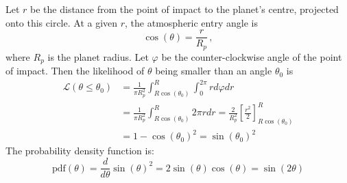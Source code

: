 Let $r$ be the distance from the point of impact to the planet's centre, projected onto this circle. At a given $r$, the atmospheric entry angle is
\begin{equation*}
    \cos(\theta) = \frac{r}{R_p}\,,
\end{equation*}
where $R_p$ is the planet radius. Let $\varphi$ be the counter-clockwise angle of the point of impact. Then the likelihood of $\theta$ being smaller than an angle $\theta_0$ is
\begin{align}
    \mathcal{L}(\theta \leq \theta_0) &= \frac{1}{\pi R_p^2} \int_{R\cos(\theta_0)}^R \int_0^{2\pi} r d\varphi dr \nonumber\\
    &= \frac{1}{\pi R_p^2} \int_{R\cos(\theta_0)}^R 2\pi r dr = \frac{2}{R_p^2} \left[\frac{r^2}{2}\right]_{R\cos(\theta_0)}^R \nonumber\\
    &= 1 - \cos(\theta_0)^2 = \sin(\theta_0)^2
\end{align}
The probability density function is:
\begin{equation}
    \mathrm{pdf}(\theta) = \frac{d}{d\theta}\sin(\theta)^2 = 2\sin(\theta)\cos(\theta) = \sin(2\theta)
\end{equation}
